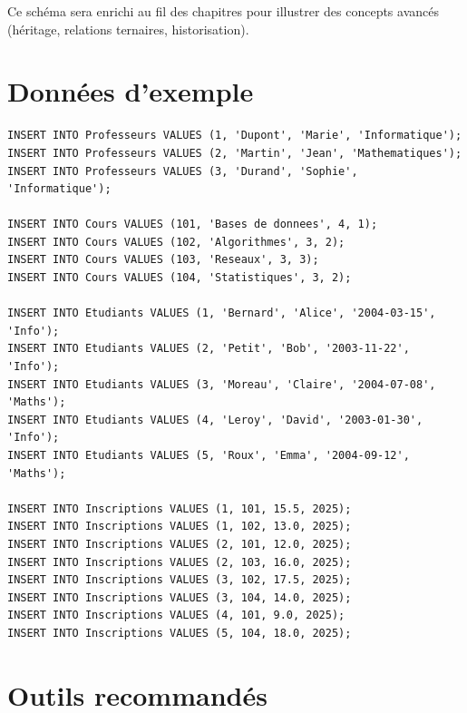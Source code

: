 Ce sch\'ema sera enrichi au fil des chapitres pour illustrer des concepts
avanc\'es (h\'eritage, relations ternaires, historisation).

\section*{Donn\'ees d'exemple}

\begin{codeblock}[title=\textbf{Insertion des donn\'ees d'exemple}]
\begin{verbatim}
INSERT INTO Professeurs VALUES (1, 'Dupont', 'Marie', 'Informatique');
INSERT INTO Professeurs VALUES (2, 'Martin', 'Jean', 'Mathematiques');
INSERT INTO Professeurs VALUES (3, 'Durand', 'Sophie', 'Informatique');

INSERT INTO Cours VALUES (101, 'Bases de donnees', 4, 1);
INSERT INTO Cours VALUES (102, 'Algorithmes', 3, 2);
INSERT INTO Cours VALUES (103, 'Reseaux', 3, 3);
INSERT INTO Cours VALUES (104, 'Statistiques', 3, 2);

INSERT INTO Etudiants VALUES (1, 'Bernard', 'Alice', '2004-03-15', 'Info');
INSERT INTO Etudiants VALUES (2, 'Petit', 'Bob', '2003-11-22', 'Info');
INSERT INTO Etudiants VALUES (3, 'Moreau', 'Claire', '2004-07-08', 'Maths');
INSERT INTO Etudiants VALUES (4, 'Leroy', 'David', '2003-01-30', 'Info');
INSERT INTO Etudiants VALUES (5, 'Roux', 'Emma', '2004-09-12', 'Maths');

INSERT INTO Inscriptions VALUES (1, 101, 15.5, 2025);
INSERT INTO Inscriptions VALUES (1, 102, 13.0, 2025);
INSERT INTO Inscriptions VALUES (2, 101, 12.0, 2025);
INSERT INTO Inscriptions VALUES (2, 103, 16.0, 2025);
INSERT INTO Inscriptions VALUES (3, 102, 17.5, 2025);
INSERT INTO Inscriptions VALUES (3, 104, 14.0, 2025);
INSERT INTO Inscriptions VALUES (4, 101, 9.0, 2025);
INSERT INTO Inscriptions VALUES (5, 104, 18.0, 2025);
\end{verbatim}
\end{codeblock}

\section*{Outils recommand\'es}

